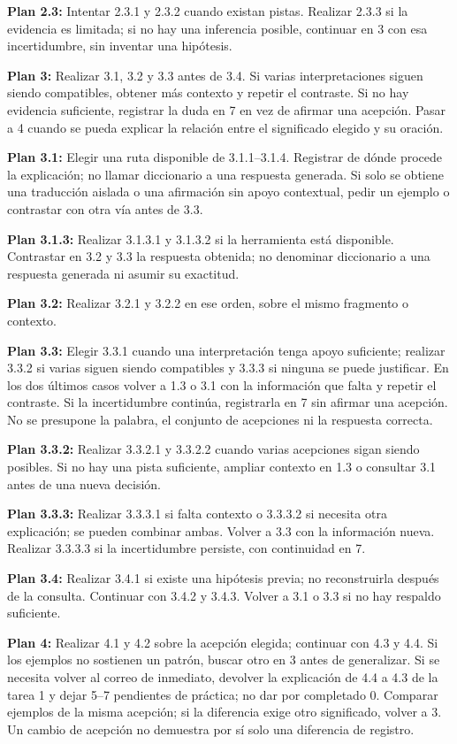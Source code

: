 \documentclass[10pt,a4paper]{article}
\begin{document}
\textbf{Plan 2.3:} Intentar 2.3.1 y 2.3.2 cuando existan pistas. Realizar 2.3.3 si la evidencia es limitada; si no hay una inferencia posible, continuar en 3 con esa incertidumbre, sin inventar una hipótesis.\par
\textbf{Plan 3:} Realizar 3.1, 3.2 y 3.3 antes de 3.4. Si varias interpretaciones siguen siendo compatibles, obtener más contexto y repetir el contraste. Si no hay evidencia suficiente, registrar la duda en 7 en vez de afirmar una acepción. Pasar a 4 cuando se pueda explicar la relación entre el significado elegido y su oración.\par
\textbf{Plan 3.1:} Elegir una ruta disponible de 3.1.1--3.1.4. Registrar de dónde procede la explicación; no llamar diccionario a una respuesta generada. Si solo se obtiene una traducción aislada o una afirmación sin apoyo contextual, pedir un ejemplo o contrastar con otra vía antes de 3.3.\par
\textbf{Plan 3.1.3:} Realizar 3.1.3.1 y 3.1.3.2 si la herramienta está disponible. Contrastar en 3.2 y 3.3 la respuesta obtenida; no denominar diccionario a una respuesta generada ni asumir su exactitud.\par
\textbf{Plan 3.2:} Realizar 3.2.1 y 3.2.2 en ese orden, sobre el mismo fragmento o contexto.\par
\textbf{Plan 3.3:} Elegir 3.3.1 cuando una interpretación tenga apoyo suficiente; realizar 3.3.2 si varias siguen siendo compatibles y 3.3.3 si ninguna se puede justificar. En los dos últimos casos volver a 1.3 o 3.1 con la información que falta y repetir el contraste. Si la incertidumbre continúa, registrarla en 7 sin afirmar una acepción. No se presupone la palabra, el conjunto de acepciones ni la respuesta correcta.\par
\textbf{Plan 3.3.2:} Realizar 3.3.2.1 y 3.3.2.2 cuando varias acepciones sigan siendo posibles. Si no hay una pista suficiente, ampliar contexto en 1.3 o consultar 3.1 antes de una nueva decisión.\par
\textbf{Plan 3.3.3:} Realizar 3.3.3.1 si falta contexto o 3.3.3.2 si necesita otra explicación; se pueden combinar ambas. Volver a 3.3 con la información nueva. Realizar 3.3.3.3 si la incertidumbre persiste, con continuidad en 7.\par
\textbf{Plan 3.4:} Realizar 3.4.1 si existe una hipótesis previa; no reconstruirla después de la consulta. Continuar con 3.4.2 y 3.4.3. Volver a 3.1 o 3.3 si no hay respaldo suficiente.\par
\textbf{Plan 4:} Realizar 4.1 y 4.2 sobre la acepción elegida; continuar con 4.3 y 4.4. Si los ejemplos no sostienen un patrón, buscar otro en 3 antes de generalizar. Si se necesita volver al correo de inmediato, devolver la explicación de 4.4 a 4.3 de la tarea 1 y dejar 5--7 pendientes de práctica; no dar por completado 0. Comparar ejemplos de la misma acepción; si la diferencia exige otro significado, volver a 3. Un cambio de acepción no demuestra por sí solo una diferencia de registro.\par
\end{document}
